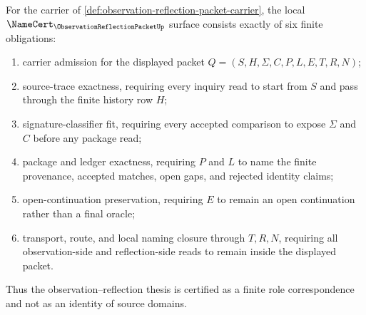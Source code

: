 \begin{theorem}
\label{thm:observation-reflection-packet-namecert-obligations}
For the carrier of \autoref{def:observation-reflection-packet-carrier}, the local $\NameCert_{\ObservationReflectionPacketUp}$ surface consists exactly of six finite obligations:
\begin{enumerate}
\item carrier admission for the displayed packet $Q=(S,H,\Sigma,C,P,L,E,T,R,N)$;
\item source-trace exactness, requiring every inquiry read to start from $S$ and pass through the finite history row $H$;
\item signature-classifier fit, requiring every accepted comparison to expose $\Sigma$ and $C$ before any package read;
\item package and ledger exactness, requiring $P$ and $L$ to name the finite provenance, accepted matches, open gaps, and rejected identity claims;
\item open-continuation preservation, requiring $E$ to remain an open continuation rather than a final oracle;
\item transport, route, and local naming closure through $T,R,N$, requiring all observation-side and reflection-side reads to remain inside the displayed packet.
\end{enumerate}
Thus the observation--reflection thesis is certified as a finite role correspondence and not as an identity of source domains.
\end{theorem}
